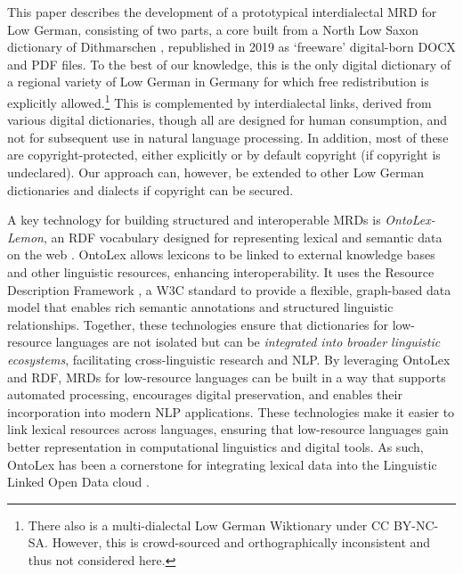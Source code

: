 This paper describes the development of a prototypical interdialectal MRD for Low German, consisting of two parts, a core built from a North Low Saxon dictionary of Dithmarschen \cite[further WöWö]{neuber-2001-woerner-woer}, republished in 2019 as  `freeware' digital-born DOCX and PDF files. To the best of our knowledge, this is the only digital dictionary of a regional variety of Low German in Germany for which free redistribution is explicitly allowed.\footnote{
    There also is a multi-dialectal Low German Wiktionary under CC BY-NC-SA. However, this is crowd-sourced and orthographically inconsistent and thus not considered here. 
}
This is complemented by interdialectal links, derived from various digital dictionaries, though all are designed for human consumption, and not for subsequent use in natural language processing. In addition, most of these are copyright-protected, either explicitly or by default copyright (if copyright is undeclared). Our approach can, however, be extended to other Low German dictionaries and dialects if copyright can be secured.
    
A key technology for building structured and interoperable MRDs is \emph{OntoLex-Lemon}, an RDF vocabulary  designed for representing lexical and semantic data on the web \cite{mccrae2017ontolex}. OntoLex allows lexicons to be linked to external knowledge bases and other linguistic resources, enhancing interoperability. It uses the Resource Description Framework \cite[RDF]{beckett2014rdf}, a W3C standard to provide a flexible, graph-based data model that enables rich semantic annotations and structured linguistic relationships. Together, these technologies ensure that dictionaries for low-resource languages are not isolated but can be \emph{integrated into broader linguistic ecosystems}, facilitating cross-linguistic research and NLP. By leveraging OntoLex and RDF, MRDs for low-resource languages can be built in a way that supports automated processing, encourages digital preservation, and enables their incorporation into modern NLP applications. 
These technologies make it easier to link lexical resources across languages, ensuring that low-resource languages gain better representation in computational linguistics and digital tools. As such, OntoLex has been a cornerstone for integrating lexical data into the Linguistic Linked Open Data cloud \cite{declerck2018towards}. 

